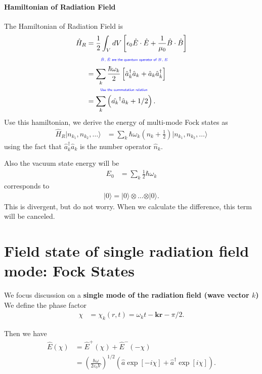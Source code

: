 \documentclass[../../note.tex]{subfiles}
\begin{document}
\paragraph{Hamiltonian of Radiation Field}
The Hamiltonian of Radiation Field is
\begin{align}
    \hat{H}_R 
    &= \frac{1}{2} \int_V dV \left[\epsilon_0 \hat{E} \cdot \hat{E} + \frac{1}{\mu_0} \hat{B} \cdot \hat{B}\right] \\
    &\qquad\text{\color{blue}{\tiny\sffamily $\hat{B}, \hat{E}$ are the quantum operator of $B,E$}} \nonumber \\
    &= \sum_k \frac{\hbar \omega_k}{2} \left[\hat{a}_k^\dagger \hat{a}_k + \hat{a}_k \hat{a}_k^\dagger \right] \\
    &\qquad\text{\color{blue}{\tiny\sffamily Use the commutation relation}} \nonumber \\
    &= \sum_k \left(\hat{a_k}^\dagger \hat{a}_k + 1/2\right).
\end{align}
Use this hamiltonian, we derive the energy of multi-mode Fock states as
\begin{align}
    \hat{H}_R \vert n_{k_1}, n_{k_2},\dots \rangle
    &= \sum_k \hbar \omega_k \left(n_k + \frac{1}{2}\right) \vert n_{k_1}, n_{k_2},\dots \rangle
\end{align}
using the fact that $\hat{a}_k^\dagger \hat{a}_k$ is the number operator $\hat{n}_k$.

Also the vacuum state energy will be
\begin{align}
    E_0
    &= \sum_k \frac{1}{2} \hbar \omega_k
\end{align}
corresponds to 
\begin{align}
    \vert 0 \rangle = \vert 0 \rangle \otimes \dots \otimes \vert 0 \rangle.
\end{align}
This is divergent, but do not worry. When we calculate the difference, this term will be canceled.

\section{Field state of single radiation field mode: Fock States}
We focus  discussion on a \textbf{single mode of the radiation field (wave vector $k$)}
We define the phase factor
\begin{align}
    \chi
    &= \chi_{k}(r,t) = \omega_{k} t - \textbf{kr} - \pi/2.
\end{align}

Then we have
\begin{align}
    \hat{E}(\chi)
    &= \hat{E}^+(\chi) + \hat{E}^{-}(-\chi) \\
    &= \left(\frac{\hbar \omega}{2 \varepsilon_0 V}\right)^{1/2} (\hat{a} \exp[-i \chi] + \hat{a}^\dagger \exp[i \chi]).
\end{align}
\end{document}
